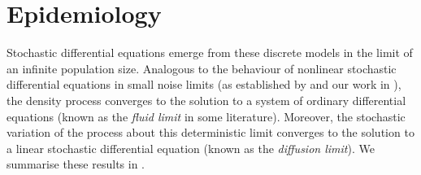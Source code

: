 




\section{Epidemiology}



Stochastic differential equations emerge from these discrete models in the limit of an infinite population size.
Analogous to the behaviour of nonlinear stochastic differential equations in small noise limits (as established by \citet{FreidlinWentzell_1998_RandomPerturbationsDynamical} and our work in ), the density process converges to the solution to a system of ordinary differential equations (known as the \emph{fluid limit} in some literature).
Moreover, the stochastic variation of the process about this deterministic limit converges to the solution to a linear stochastic differential equation (known as the \emph{diffusion limit}).
We summarise these results in .




